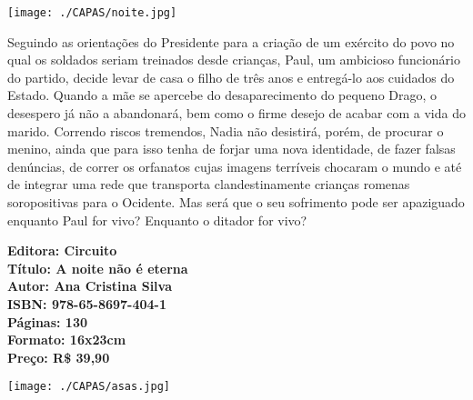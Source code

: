 \pagebreak %


\begin{center}
\hspace*{-3.6cm}
\hspace*{3.1cm}\texttt{[image: ./CAPAS/noite.jpg]}
\end{center}

\hspace*{-7cm}\hrulefill\hspace*{-7cm}

\medskip

\noindent{} Seguindo as orientações do Presidente para a criação de um exército do povo no qual os soldados seriam treinados desde crianças, Paul, um ambicioso funcionário do partido, decide levar de casa o filho de três anos e entregá-lo aos cuidados do Estado. Quando a mãe se apercebe do desaparecimento do pequeno Drago, o desespero já não a abandonará,
bem como o firme desejo de acabar com a vida do marido. Correndo riscos tremendos,
Nadia não desistirá, porém, de procurar o menino, ainda que para isso tenha de forjar
uma nova identidade, de fazer falsas denúncias, de correr os orfanatos cujas imagens
terríveis chocaram o mundo e até de integrar uma rede que transporta clandestinamente
crianças romenas soropositivas para o Ocidente. Mas será que o seu sofrimento pode
ser apaziguado enquanto Paul for vivo? Enquanto o ditador for vivo?

\vfill

\hspace*{-.4cm}\begin{minipage}[c]{1\linewidth}
\small\textbf{
\hspace*{-.1cm}Editora: Circuito\\
Título: A noite não é eterna\\
Autor: Ana Cristina Silva\\ 
ISBN: 978-65-8697-404-1\\
Páginas: 130\\
Formato: 16x23cm\\
Preço: R\$ 39,90\\
}
\end{minipage}

\pagebreak

\begin{center}
\hspace*{.5cm}\texttt{[image: ./CAPAS/asas.jpg]}
\end{center}

